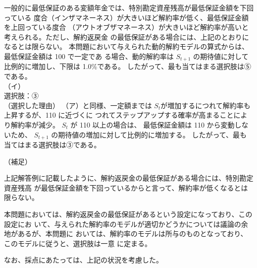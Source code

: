 \documentclass[report,gutter=10mm,fore-edge=10mm,uplatex,dvipdfmx]{jlreq}
\begin{document}
一般的に最低保証のある変額年金では、特別勘定資産残高が最低保証金額を下回っている
度合（インザマネーネス）が大きいほど解約率が低く、最低保証金額を上回っている度合
（アウトオブザマネーネス）が大きいほど解約率が高いと考えられる。ただし、解約返戻金
の最低保証がある場合には、上記のとおりになるとは限らない。
本問題において与えられた動的解約モデルの算式からは、最低保証金額は 100 で一定であ
る場合、動的解約率は $S_{t+1}$ の期待値に対して比例的に増加し、下限は 1.0\%である。
したがって、最も当てはまる選択肢は⑤である。\vspace{1zh} \\
（イ）\\
選択肢：③\\
（選択した理由）
（ア）と同様、一定額までは $S_t$が増加するにつれて解約率も上昇するが、110 に近づくに
つれてステップアップする確率が高まることにより解約率が減少。 $S_t$ が 110 以上の場合は、
最低保証金額は 110 から変動しないため、 $S_{t+1}$ の期待値の増加に対して比例的に増加する。
したがって、最も当てはまる選択肢は③である。\vspace{1zh} 

\noindent（補足）

上記解答例に記載したように、解約返戻金の最低保証がある場合には、特別勘定資産残高
が最低保証金額を下回っているからと言って、解約率が低くなるとは限らない。

本問題においては、解約返戻金の最低保証があるという設定になっており、この設定にお
いて、与えられた解約率のモデルが適切かどうかについては議論の余地があるが、本問題に
おいては、解約率のモデルは所与のものとなっており、このモデルに従うと、選択肢は一意
に定まる。

なお、採点にあたっては、上記の状況を考慮した。
\end{document}
